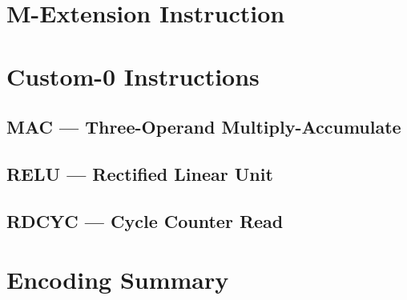 \section{M-Extension Instruction}

\section{Custom-0 Instructions}
\subsection{MAC — Three-Operand Multiply-Accumulate}
\subsection{RELU — Rectified Linear Unit}
\subsection{RDCYC — Cycle Counter Read}

\section{Encoding Summary}
